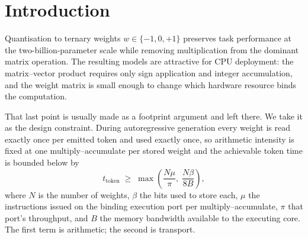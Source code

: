 \documentclass[11pt,a4paper]{article}
\newcommand{\code}[1]{\texttt{#1}}
\begin{document}
\begin{abstract}
its Zen 2 value on every newer target it covers --- four distinct scheduler
models rather than six, since \code{znver3}, \code{znver4} and \code{znver5}
return identical counts, so what is supported is one-sided, that the ratio does
not run away, and not that it is constant --- and a reviewer's Intel Xeon
reproduces it at \num{2.11} against our \num{2.43}. On real VNNI hardware the same reviewer
measures the ratio rising by \SI{8.8}{\percent} --- the direction predicted, from
the predicted mechanism, at a magnitude smaller than the eight-bit storage choice
of a system built for those targets would suggest, though on a shared host whose
spread exceeds the effect.
\end{abstract}

\section{Introduction}

Quantisation to ternary weights $w\in\{-1,0,+1\}$ preserves task performance at
the two-billion-parameter scale while removing multiplication from the dominant
matrix operation. The resulting models are attractive for CPU deployment: the
matrix--vector product requires only sign application and integer accumulation,
and the weight matrix is small enough to change which hardware resource binds
the computation.

That last point is usually made as a footprint argument and left there. We take
it as the design constraint. During autoregressive generation every weight is
read exactly once per emitted token and used exactly once, so arithmetic
intensity is fixed at one multiply--accumulate per stored weight and the
achievable token time is bounded below by
\begin{equation}
t_{\text{token}} \;\ge\; \max\!\left(\frac{N\mu}{\pi},\;\frac{N\beta}{8B}\right),
\label{eq:roofline}
\end{equation}
where $N$ is the number of weights, $\beta$ the bits used to store each, $\mu$
the instructions issued on the binding execution port per multiply--accumulate,
$\pi$ that port's throughput, and $B$ the memory bandwidth available to the
executing core. The first term is arithmetic; the second is transport.
\end{document}

